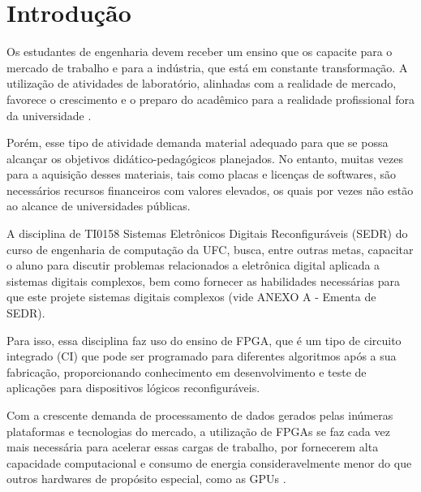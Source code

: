 \chapter{Introdução}
\label{cap:introducao}



Os estudantes de engenharia devem receber um ensino que os capacite para o mercado de trabalho e para a indústria, que está em constante transformação. A utilização de atividades de laboratório, alinhadas com a realidade de mercado, favorece o crescimento e o preparo do acadêmico para a realidade profissional fora da universidade \cite{fadep2013}. 

Porém, esse tipo de atividade demanda material adequado para que se possa alcançar os objetivos didático-pedagógicos planejados. No entanto, muitas vezes para a aquisição desses materiais, tais como placas e licenças de softwares, são necessários recursos financeiros com valores elevados, os quais por vezes não estão ao alcance de universidades públicas.

A disciplina de TI0158 Sistemas Eletrônicos Digitais Reconfiguráveis (SEDR) do curso de engenharia de computação da UFC, busca, entre outras metas, capacitar o aluno para discutir problemas relacionados a eletrônica digital aplicada a sistemas digitais complexos, bem como fornecer as habilidades necessárias para que este projete sistemas digitais complexos (vide ANEXO A - Ementa de SEDR).

Para isso, essa disciplina faz uso do ensino de FPGA, que é um tipo de circuito integrado (CI) que pode ser programado para diferentes algoritmos após a sua fabricação, proporcionando conhecimento em desenvolvimento e teste de aplicações para dispositivos lógicos reconfiguráveis. 

Com a crescente demanda de processamento de dados gerados pelas inúmeras plataformas e tecnologias do mercado, a utilização de FPGAs se faz cada vez mais necessária para acelerar essas cargas de trabalho, por fornecerem alta capacidade computacional e consumo de energia consideravelmente menor do que outros hardwares de propósito especial, como as GPUs \cite{7859319}.

